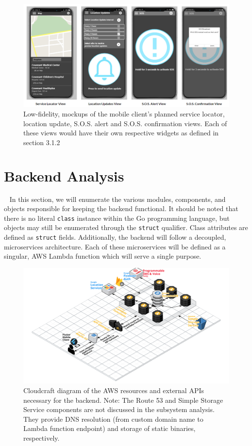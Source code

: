 \documentclass[10pt, a4paper]{article}
\begin{document}
\begin{figure}[H]
  \centerline{
  \includegraphics[scale=0.9]{mockups.png}
  }
  \caption{Low-fidelity, mockups of the mobile client's planned service locator, location update, S.O.S. alert and S.O.S. confirmation views. Each of these views would have their own respective widgets as defined in section 3.1.2}
\end{figure}

\newpage

\section{Backend Analysis}
\par ~ In this section, we will enumerate the various modules, components, and objects responsible for keeping the backend functional. It should be noted that there is no literal \texttt{class} instance within the Go programming language, but objects may still be enumerated through the \texttt{struct} qualifier. Class attributes are defined as \texttt{struct} fields. Additionally, the backend will follow a decoupled, microservices architecture. Each of these microservices will be defined as a singular, AWS Lambda function which will serve a single purpose.

\begin{figure}[H]
\begin{center}
\centerline{
	\includegraphics[scale=.15]{EmergenSeek-Backend.PNG}
}
\caption{Cloudcraft \cite{one} diagram of the AWS resources and external APIs necessary for the backend. Note: The Route 53 and Simple Storage Service components are not discussed in the subsystem analysis. They provide DNS resolution (from custom domain name to Lambda function endpoint) and storage of static binaries, respectively.}
\end{center}	
\end{figure}
\end{document}
